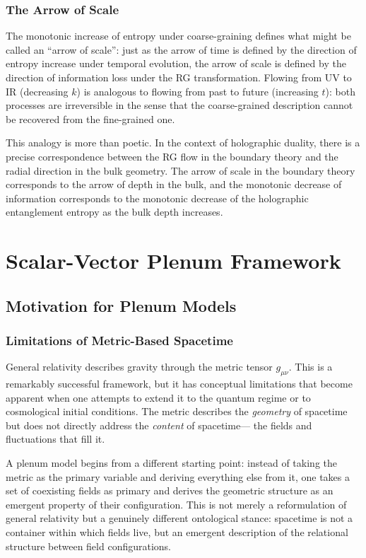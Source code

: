 \documentclass[12pt,a4paper,oneside]{book}
\theoremstyle{definition}
\theoremstyle{plain}
\theoremstyle{remark}
\begin{document}
\section{The Arrow of Scale}

The monotonic increase of entropy under coarse-graining defines what might
be called an ``arrow of scale'': just as the arrow of time is defined by the
direction of entropy increase under temporal evolution, the arrow of scale
is defined by the direction of information loss under the RG transformation.
Flowing from UV to IR (decreasing $k$) is analogous to flowing from past
to future (increasing $t$): both processes are irreversible in the sense that
the coarse-grained description cannot be recovered from the fine-grained one.

This analogy is more than poetic. In the context of holographic duality,
there is a precise correspondence between the RG flow in the boundary theory
and the radial direction in the bulk geometry. The arrow of scale in the
boundary theory corresponds to the arrow of depth in the bulk, and the
monotonic decrease of information corresponds to the monotonic decrease of
the holographic entanglement entropy as the bulk depth increases.

\part{Scalar-Vector Plenum Framework}

\chapter{Motivation for Plenum Models}

\section{Limitations of Metric-Based Spacetime}

General relativity describes gravity through the metric tensor $g_{\mu\nu}$.
This is a remarkably successful framework, but it has conceptual limitations
that become apparent when one attempts to extend it to the quantum regime or
to cosmological initial conditions. The metric describes the \emph{geometry}
of spacetime but does not directly address the \emph{content} of spacetime---
the fields and fluctuations that fill it.

A plenum model begins from a different starting point: instead of taking
the metric as the primary variable and deriving everything else from it,
one takes a set of coexisting fields as primary and derives the geometric
structure as an emergent property of their configuration. This is not merely
a reformulation of general relativity but a genuinely different ontological
stance: spacetime is not a container within which fields live, but an
emergent description of the relational structure between field configurations.
\end{document}
